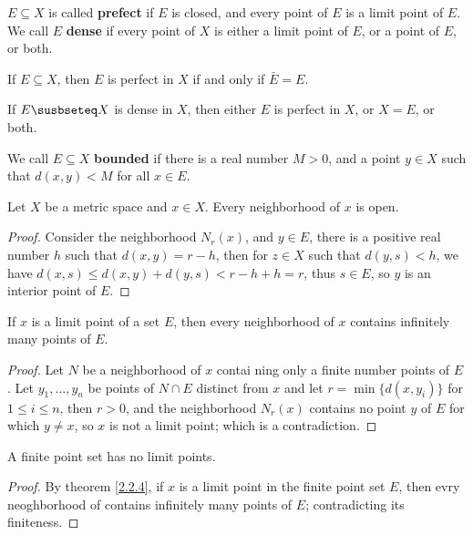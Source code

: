 \begin{definition}
    $E \subseteq X$ is called \textbf{prefect} if  $E$ is closed, and every point of $E$ is a limit
    point of $E$. We call $E$ \textbf{dense} if  every point of  $X$ is either a limit point
    of $E$, or a point of  $E$, or both.
\end{definition}

\begin{lemma}\label{2.2.2}
    If $E \subseteq X$, then  $E$ is perfect in  $X$ if and only if  $\bar{E}=E$.
\end{lemma}

\begin{lemma}\label{2.2.3}
    If $E \susbseteq X$ is dense in  $X$, then either  $E$ is perfect in $X$, or
    $X=E$, or both.
\end{lemma}

\begin{definition}
    We call  $E \subseteq X$ \textbf{bounded} if there is a real number  $M>0$, and a point
    $y \in X$ such that $d(x,y)<M$ for all $x \in E$.
\end{definition}

\begin{theorem}\label{2.2.3}
    Let $X$ be a metric space and  $x \in X$. Every neighborhood of  $x$ is open.
\end{theorem}
\begin{proof}
    Consider the neighborhood $N_r(x)$, and  $y \in E$, there is a positive real number
    $h$ such that $d(x,y)=r-h$, then for $z \in X$ such that $d(y,s)<h$, we have
    $d(x,s) \leq d(x,y)+d(y,s)<r-h+h=r$, thus $s \in E$, so $y$ is an interior point of $E$.
\end{proof}

\begin{theorem}\label{2.2.4}
    If $x$ is a limit point of a set  $E$, then every neighborhood of  $x$ contains infinitely many
    points of  $E$.
\end{theorem}
\begin{proof}
    Let $N$ be a neighborhood of  $x$ contai ning only a finite number points of $E$. Let
    $y_1, \dots, y_n$ be points of $N \cap E$ distinct from  $x$ and let $r=\min\{d(x,y_i)\}$
    for  $1 \leq i \leq n$, then  $r>0$, and the neighborhood  $N_r(x)$ contains no point  $y$
    of  $E$ for which $y \neq x$, so $x$ is not a limit point; which is a contradiction.
\end{proof}

\begin{corollary}
    A finite point set has no limit points.
\end{corollary}
\begin{proof}
    By theorem \ref{2.2.4}, if $x$ is a limit point in the finite point set $E$, then
    evry neoghborhood of contains infinitely many points of $E$; contradicting its finiteness.
\end{proof}


